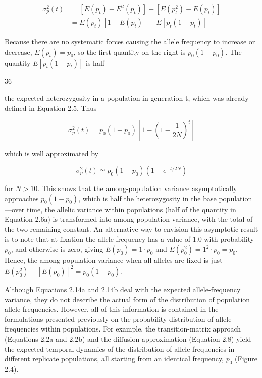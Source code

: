 \documentclass{article}
\begin{document}
\begin{equation}
\begin{aligned}\sigma_{p}^{2}(t)&=[E(p_{t})-E^{2}(p_{t})]+[E(p_{t}^{2})-E(p_{t})]\\&=E(p_{t})[1-E(p_{t})]-E[p_{t}(1-p_{t})]\end{aligned}
\end{equation}

Because there are no systematic forces causing the allele frequency to increase or decrease,  $ E(p_t) = p_0 $, so the first quantity on the right is  $ p_0(1 - p_0) $. The quantity  $ E[p_t(1 - p_t)] $ is half

36

the expected heterozygosity in a population in generation t, which was already defined in Equation 2.5. Thus

\begin{equation}
\sigma_{p}^{2}(t)=p_{0}(1-p_{0})\left[1-\left(1-\frac{1}{2N}\right)^{t}\right]
\tag{2.14a}
\label{eq:2_14a}
\end{equation}

which is well approximated by

\begin{equation}
\sigma_{p}^{2}(t)\simeq p_{0}(1-p_{0})(1-e^{-t/2N})
\end{equation}

for $N > 10$. This shows that the among-population variance asymptotically approaches $p_0(1 - p_0)$, which is half the heterozygosity in the base population—over time, the allelic variance within populations (half of the quantity in Equation 2.6a) is transformed into among-population variance, with the total of the two remaining constant. An alternative way to envision this asymptotic result is to note that at fixation the allele frequency has a value of 1.0 with probability $p_0$, and otherwise is zero, giving $E(p_0) = 1 \cdot p_0$ and $E(p_0^2) = 1^2 \cdot p_0 = p_0$. Hence, the among-population variance when all alleles are fixed is just $E(p_0^2) - [E(p_0)]^2 = p_0(1 - p_0)$.

Although Equations 2.14a and 2.14b deal with the expected allele-frequency variance, they do not describe the actual form of the distribution of population allele frequencies. However, all of this information is contained in the formulations presented previously on the probability distribution of allele frequencies within populations. For example, the transition-matrix approach (Equations 2.2a and 2.2b) and the diffusion approximation (Equation 2.8) yield the expected temporal dynamics of the distribution of allele frequencies in different replicate populations, all starting from an identical frequency,  $ p_{0} $ (Figure 2.4).
\end{document}
